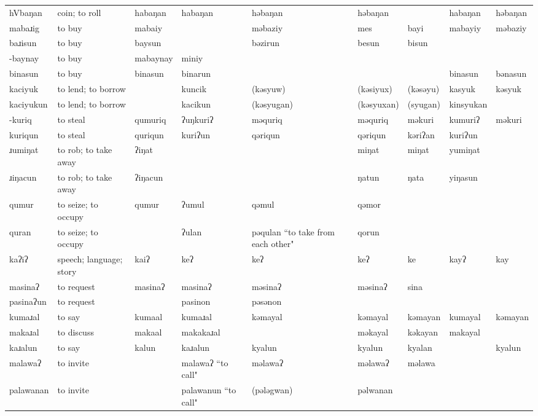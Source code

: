 \begin{landscape}
\begin{longtable}{*{9}{p{}}}
\text{*}hVbaŋan & coin; to roll & habaŋan & habaŋan & həbaŋan & həbaŋan &  & habaŋan & həbaŋan\\
\text{*}mabaɹig & to buy & mabaiy &  & məbaziy & mes & bayi & mabayiy & məbaziy\\
\text{*}baɹisun & to buy & baysun &  & bəzirun & besun & bisun &  & \\
\text{*}-baynay & to buy & mabaynay & miniy &  &  &  &  & \\
\text{*}binasun & to buy & binasun & binarun &  &  &  & binasun & bənasun\\
\text{*}kaciyuk & to lend; to borrow &  & kuncik & (kəsyuw) & (kəsiyux) & (kəsəyu) & kasyuk & kəsyuk\\
\text{*}kaciyukun & to lend; to borrow &  & kacikun & (kəsyugan) & (kəsyuxan) & (syugan) & kinsyukan & \\
\text{*}-kuriq & to steal & qumuriq & ʔuŋkuriʔ & məquriq & məquriq & məkuri & kumuriʔ & məkuri\\
\text{*}kuriqun & to steal & quriqun & kuriʔun & qəriqun & qəriqun & kəriʔan & kuriʔun & \\
\text{*}ɹumiŋat & to rob; to take away & ʔiŋat &  &  & miŋat & miŋat & yumiŋat & \\
\text{*}ɹiŋacun & to rob; to take away & ʔiŋacun &  &  & ŋatun & ŋata & yiŋasun & \\
\text{*}qumur & to seize; to occupy & qumur & ʔumul & qəmul & qəmor &  &  & \\
\text{*}quran & to seize; to occupy &  & ʔulan & pəqulan ``to take from each other" & qorun &  &  & \\
\text{*}kaʔiʔ & speech; language; story & kaiʔ & keʔ & keʔ & keʔ & ke & kayʔ & kay\\
\text{*}masinaʔ & to request & masinaʔ & masinaʔ & məsinaʔ & məsinaʔ & sina &  & \\
\text{*}pasinaʔun & to request &  & pasinon & pəsənon &  &  &  & \\
\text{*}kumaɹal & to say & kumaal & kumaɹal & kəmayal & kəmayal & kəmayan & kumayal & kəmayan\\
\text{*}makaɹal & to discuss & makaal & makakaɹal &  & məkayal & kəkayan & makayal & \\
\text{*}kaɹalun & to say & kalun & kaɹalun & kyalun & kyalun & kyalan &  & kyalun\\
\text{*}malawaʔ & to invite &  & malawaʔ ``to call" & məlawaʔ & məlawaʔ & məlawa &  & \\
\text{*}palawanan & to invite &  & palawanun ``to call" & (pələgwan) & pəlwanan &  &  & \\

\end{longtable}
\end{landscape}
